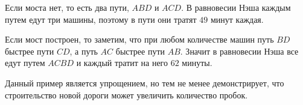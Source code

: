 \begin{solution}
Если моста нет, то есть два пути, $ABD$ и $ACD$. В равновесии Нэша каждым путем едут три машины, поэтому в пути они тратят $49$ минут каждая.

Если мост построен, то заметим, что при любом количестве машин путь $BD$ быстрее пути $CD$, а путь $AC$ быстрее пути $AB$. Значит в равновесии Нэша все едут путем $ACBD$ и каждый тратит на него $62$ минуты.

Данный пример является упрощением, но тем не менее демонстрирует, что строительство новой дороги может увеличить количество пробок.
\end{solution}




